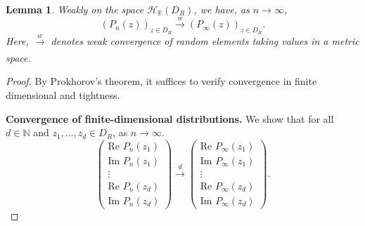 \documentclass[12pt, reqno]{amsart}
\theoremstyle{plain}
\newtheorem{lemma}[theorem]{Lemma}
\theoremstyle{definition}
\begin{document}
\begin{lemma}\label{lem:FunctionalLimitTheorem}
    Weakly on the space $\mathcal{H}_{\mathbb{R}}(D_{R})$, we have, as $n \rightarrow \infty$,
    \begin{equation*}
        (P_n(z))_{z \in D_{R}} \xrightarrow[]{w} (P_{\infty}(z))_{z \in D_{R}}.
    \end{equation*}
    Here, $\xrightarrow[]{w} $  denotes weak convergence of random elements taking values in a metric space.
\end{lemma}

\begin{proof} 
By Prokhorov’s theorem, it suffices to verify convergence in finite dimensional and tightness.
	
	\textbf{Convergence of finite-dimensional distributions. }
    We show that for all $d \in \mathbb{N}$ and $z_1, \dots, z_d \in D_{R}$, as $n \rightarrow \infty$.
    \begin{equation*}
        \begin{pmatrix}
            \text{Re } P_n(z_1) \\
            \text{Im } P_n(z_1) \\
            \vdots \\
            \text{Re } P_n(z_d) \\
            \text{Im } P_n(z_d)
        \end{pmatrix} \xrightarrow[]{d} \begin{pmatrix}
            \text{Re } P_{\infty}(z_1) \\
            \text{Im } P_{\infty}(z_1) \\
            \vdots \\
            \text{Re } P_{\infty}(z_d) \\
            \text{Im } P_{\infty}(z_d)
        \end{pmatrix}.
    \end{equation*}


\end{proof}
\end{document}

